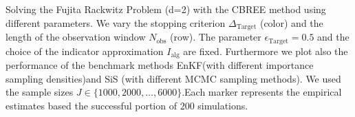 Solving the Fujita Rackwitz Problem (d=2) with the CBREE method using  different parameters. We vary the stopping criterion $\Delta_{\text{Target}}$ (color) and the length of the observation window $N_\text{obs}$ (row). The parameter $\epsilon_{\text{Target}} = 0.5$ and the choice of the indicator approximation $I_\text{alg}$ are fixed. Furthermore we plot also the performance of the benchmark methods EnKF(with different importance sampling densities)and SiS (with different MCMC sampling methods). We used the sample sizes $J \in \{1000, 2000, \ldots, 6000\}$.Each marker represents the empirical estimates based the successful portion of $200$ simulations.
